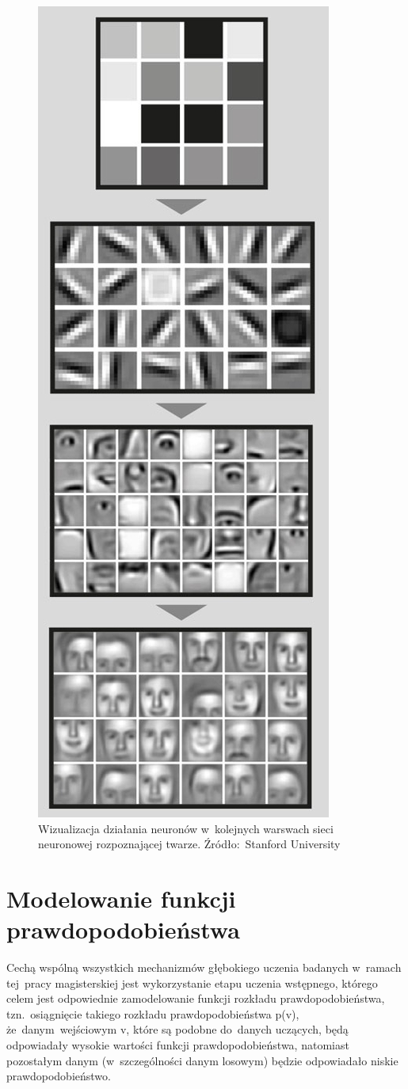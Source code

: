\begin{figure}[H]
	\centering
	\includegraphics[width=0.45\linewidth]{img/hierarchical-learning_cropped.jpg}
	\caption{Wizualizacja działania neuronów w~kolejnych warswach sieci neuronowej rozpoznającej twarze.
	Źródło:~Stanford University}
	\label{rys:hierarchical-learning}
\end{figure}

\section{Modelowanie funkcji prawdopodobieństwa}
Cechą wspólną wszystkich mechanizmów głębokiego uczenia badanych w~ramach tej~pracy magisterskiej jest
wykorzystanie etapu uczenia wstępnego, którego celem jest odpowiednie zamodelowanie
funkcji rozkładu prawdopodobieństwa, tzn.~osiągnięcie takiego rozkładu prawdopodobieństwa p(v),
że~danym~wejściowym v, które są podobne do~danych uczących, będą odpowiadały wysokie wartości
funkcji prawdopodobieństwa, natomiast pozostałym danym (w~szczególności danym losowym) będzie odpowiadało
niskie prawdopodobieństwo.

